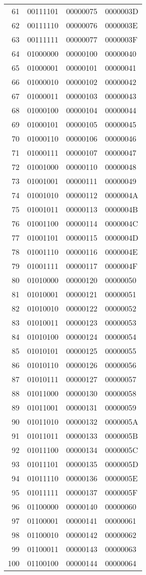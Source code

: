 \documentclass{article}
\begin{document}
\begin{longtable}{|r|l|l|l|}
61 & 00111101 & 00000075 & 0000003D \\
62 & 00111110 & 00000076 & 0000003E \\
63 & 00111111 & 00000077 & 0000003F \\
64 & 01000000 & 00000100 & 00000040 \\
65 & 01000001 & 00000101 & 00000041 \\
66 & 01000010 & 00000102 & 00000042 \\
67 & 01000011 & 00000103 & 00000043 \\
68 & 01000100 & 00000104 & 00000044 \\
69 & 01000101 & 00000105 & 00000045 \\
70 & 01000110 & 00000106 & 00000046 \\
71 & 01000111 & 00000107 & 00000047 \\
72 & 01001000 & 00000110 & 00000048 \\
73 & 01001001 & 00000111 & 00000049 \\
74 & 01001010 & 00000112 & 0000004A \\
75 & 01001011 & 00000113 & 0000004B \\
76 & 01001100 & 00000114 & 0000004C \\
77 & 01001101 & 00000115 & 0000004D \\
78 & 01001110 & 00000116 & 0000004E \\
79 & 01001111 & 00000117 & 0000004F \\
80 & 01010000 & 00000120 & 00000050 \\
81 & 01010001 & 00000121 & 00000051 \\
82 & 01010010 & 00000122 & 00000052 \\
83 & 01010011 & 00000123 & 00000053 \\
84 & 01010100 & 00000124 & 00000054 \\
85 & 01010101 & 00000125 & 00000055 \\
86 & 01010110 & 00000126 & 00000056 \\
87 & 01010111 & 00000127 & 00000057 \\
88 & 01011000 & 00000130 & 00000058 \\
89 & 01011001 & 00000131 & 00000059 \\
90 & 01011010 & 00000132 & 0000005A \\
91 & 01011011 & 00000133 & 0000005B \\
92 & 01011100 & 00000134 & 0000005C \\
93 & 01011101 & 00000135 & 0000005D \\
94 & 01011110 & 00000136 & 0000005E \\
95 & 01011111 & 00000137 & 0000005F \\
96 & 01100000 & 00000140 & 00000060 \\
97 & 01100001 & 00000141 & 00000061 \\
98 & 01100010 & 00000142 & 00000062 \\
99 & 01100011 & 00000143 & 00000063 \\
100 & 01100100 & 00000144 & 00000064 \\
\end{longtable}
\end{document}

